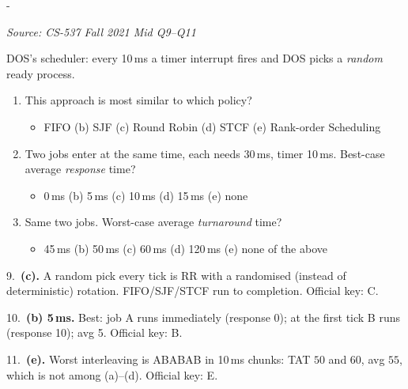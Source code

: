 \documentclass[11pt,a4paper]{article}
\makeatletter
\newcommand{\keepspace}[1]{\par\penalty-100\begingroup
  \setlength{\dimen@}{#1}\dimen@ii\pagegoal\advance\dimen@ii-\pagetotal
  \ifdim\dimen@>\dimen@ii\ifdim\dimen@ii>\z@\vfil\fi\break\fi\endgroup}
\newcounter{qn}[section]
\newenvironment{Qn}[4]{%
  \refstepcounter{qn}\keepspace{7\baselineskip}%
  \begin{tcolorbox}[qboxstyle, title={Q\thesection.\theqn\ \ [#1 \textbar\ #2]\ \ #4}]%
  {\footnotesize\color{g3}\textit{Source: #3}}\par\smallskip%
}{%
  \end{tcolorbox}%
}
\newenvironment{Sol}{%
  \begin{tcolorbox}[sboxstyle, title={Solution}]%
}{%
  \end{tcolorbox}\vspace{0.35em}%
}
\makeatother
\begin{document}
\begin{Qn}{Easy-Medium}{Lect 5--6}{CS-537 Fall 2021 Mid Q9--Q11}{Random every 10\,ms $\approx$ RR; best response; worst TAT}
DOS's scheduler: every 10\,ms a timer interrupt fires and DOS picks a \emph{random} ready process.
\begin{enumerate}
  \item[9.] This approach is most similar to which policy?
  \begin{itemize}
    \item[(a)] FIFO \quad (b) SJF \quad (c) Round Robin \quad (d) STCF \quad (e) Rank-order Scheduling
  \end{itemize}
  \item[10.] Two jobs enter at the same time, each needs 30\,ms, timer 10\,ms. Best-case average \emph{response} time?
  \begin{itemize}
    \item[(a)] 0\,ms \quad (b) 5\,ms \quad (c) 10\,ms \quad (d) 15\,ms \quad (e) none
  \end{itemize}
  \item[11.] Same two jobs. Worst-case average \emph{turnaround} time?
  \begin{itemize}
    \item[(a)] 45\,ms \quad (b) 50\,ms \quad (c) 60\,ms \quad (d) 120\,ms \quad (e) none of the above
  \end{itemize}
\end{enumerate}
\end{Qn}
\begin{Sol}
9.\ \textbf{(c).} A random pick every tick is RR with a randomised (instead of deterministic) rotation. FIFO/SJF/STCF run to completion. Official key: C.

10.\ \textbf{(b) 5\,ms.} Best: job A runs immediately (response 0); at the first tick B runs (response 10); avg 5. Official key: B.

11.\ \textbf{(e).} Worst interleaving is ABABAB in 10\,ms chunks: TAT $50$ and $60$, avg $55$, which is not among (a)--(d). Official key: E.
\end{Sol}
\end{document}
